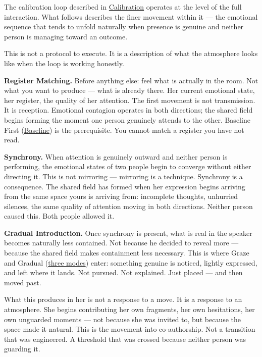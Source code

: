 The calibration loop described in \hyperref[subsec:calibration]{Calibration} operates 
at the level of the full interaction. What follows describes the finer 
movement within it --- the emotional sequence that tends to unfold naturally 
when presence is genuine and neither person is managing toward an outcome.

This is not a protocol to execute. It is a description of what the atmosphere 
looks like when the loop is working honestly.

\vspace{0.5em}
\textbf{Register Matching.}
Before anything else: feel what is actually in the room. Not what you want 
to produce --- what is already there. Her current emotional state, her 
register, the quality of her attention. The first movement is not transmission. 
It is reception. Emotional contagion operates in both directions; the shared 
field begins forming the moment one person genuinely attends to the other. 
Baseline First (\hyperref[subsec:baseline]{Baseline}) is the prerequisite. 
You cannot match a register you have not read.

\vspace{0.5em}
\textbf{Synchrony.}
When attention is genuinely outward and neither person is performing, 
the emotional states of two people begin to converge without either directing 
it. This is not mirroring --- mirroring is a technique. Synchrony is a 
consequence. The shared field has formed when her expression begins arriving 
from the same space yours is arriving from: incomplete thoughts, 
unhurried silences, the same quality of attention moving in both directions. 
Neither person caused this. Both people allowed it.

\vspace{0.5em}
\textbf{Gradual Introduction.}
Once synchrony is present, what is real in the speaker becomes naturally 
less contained. Not because he decided to reveal more --- because the shared 
field makes containment less necessary. This is where Graze and Gradual 
(\hyperref[subsec:three_modes]{three modes}) enter: something genuine is noticed, 
lightly expressed, and left where it lands. Not pursued. Not explained. 
Just placed --- and then moved past.

What this produces in her is not a response to a move. It is a response 
to an atmosphere. She begins contributing her own fragments, her own 
hesitations, her own unguarded moments --- not because she was invited to, 
but because the space made it natural. This is the movement into 
co-authorship. Not a transition that was engineered. A threshold that 
was crossed because neither person was guarding it.

